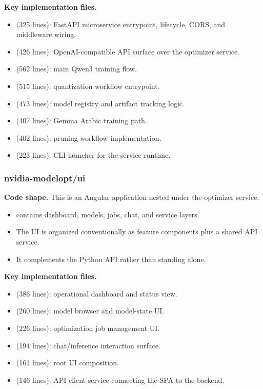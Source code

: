 \documentclass[11pt,a4paper]{article}
\begin{document}
\textbf{Key implementation files.}
\begin{itemize}[leftmargin=*]
    \item {} (325 lines): FastAPI microservice entrypoint, lifecycle, CORS, and middleware wiring.
    \item {} (426 lines): OpenAI-compatible API surface over the optimizer service.
    \item {} (562 lines): main Qwen3 training flow.
    \item {} (515 lines): quantization workflow entrypoint.
    \item {} (473 lines): model registry and artifact tracking logic.
    \item {} (407 lines): Gemma Arabic training path.
    \item {} (402 lines): pruning workflow implementation.
    \item {} (223 lines): CLI launcher for the service runtime.
\end{itemize}

\subsubsection{nvidia-modelopt/ui}

\textbf{Code shape.} This is an Angular application nested under the optimizer service.
\begin{itemize}[leftmargin=*]
    \item {} contains dashboard, models, jobs, chat, and service layers.
    \item The UI is organized conventionally as feature components plus a shared API service.
    \item It complements the Python API rather than standing alone.
\end{itemize}

\textbf{Key implementation files.}
\begin{itemize}[leftmargin=*]
    \item {} (386 lines): operational dashboard and status view.
    \item {} (260 lines): model browser and model-state UI.
    \item {} (226 lines): optimization job management UI.
    \item {} (194 lines): chat/inference interaction surface.
    \item {} (161 lines): root UI composition.
    \item {} (146 lines): API client service connecting the SPA to the backend.
\end{itemize}
\end{document}
